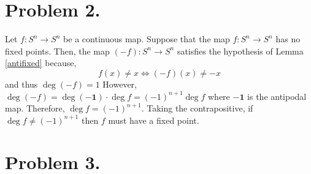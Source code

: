 \documentclass[12pt]{extarticle}
\begin{document}
\section*{Problem 2.}
Let $f : S^n \to S^n$ be a continuous map. Suppose that the map $f : S^n \to S^n$ has no fixed points. Then, the map $(-f) : S^n \to S^n$ satisfies the hypothesis of Lemma \ref{antifixed} because, 
\[f(x) \neq x \iff (-f)(x) \neq -x\]
and thus $\deg{(-f)} = 1$
However, $\deg{(-f)} = \deg{(-\mathbf{1})} \cdot \deg{f} = (-1)^{n+1} \deg{f}$ where $-\mathbf{1}$ is the antipodal map. Therefore, $\deg{f} = (-1)^{n+1}$. Taking the contrapositive, if $\deg{f} \neq (-1)^{n+1}$ then $f$ must have a fixed point. 

\section*{Problem 3.}
\end{document}
